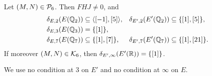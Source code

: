 \begin{lemma}\label{lem:r6-fixed}
Let $(M,N)\in\mathcal P_6$. Then $FHJ\ne0$, and
\[
\begin{aligned}
\delta_{E,2}(E(\mathbb Q_2))&\subseteq\langle[-1],[5]\rangle, & \delta_{E',2}(E'(\mathbb Q_2))&\subseteq\{[1],[5]\},\\
\delta_{E,3}(E(\mathbb Q_3))&=\{[1]\}, & &\\
\delta_{E,7}(E(\mathbb Q_7))&\subseteq\{[1],[7]\}, & \delta_{E',7}(E'(\mathbb Q_7))&\subseteq\{[1],[21]\}.
\end{aligned}
\]
If moreover $(M,N)\in\mathcal K_6$, then $\delta_{E',\infty}(E'(\mathbb R))=\{[1]\}$.
\end{lemma}

We use no condition at $3$ on $E'$ and no condition at $\infty$ on $E$.

